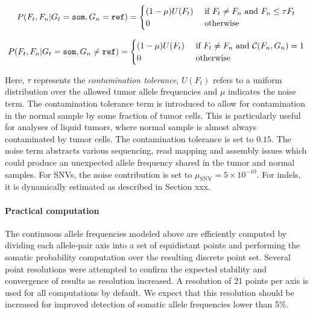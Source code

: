 \documentclass{article}
\begin{document}
\begin{equation*}
P(F_t, F_n | G_t = {\tt som}, G_n = {\tt ref})=
\begin{cases}
	(1-\mu)U(F_t) & \text{ if } F_t \neq F_n \text{ and } F_n \leq \tau F_t \\
	0 & \text{ otherwise } \\
\end{cases}
\end{equation*}

\begin{equation*}
P(F_t, F_n | G_t = {\tt som}, G_n \neq {\tt ref})=
\begin{cases}
	(1-\mu)U(F_t) & \text{ if } F_t \neq F_n \text{ and } {\cal C}(F_n, G_n) = 1\\
	0 & \text{ otherwise } \\
\end{cases}
\end{equation*}

\noindent Here, $\tau$ represents the {\em contamination tolerance}, $U(F_t)$ refers to a uniform distribution over the allowed tumor allele frequencies and $\mu$ indicates the noise term. The contamination tolerance term is introduced to allow for contamination in the normal sample by some fraction of tumor cells. This is particularly useful for analyses of liquid tumors, where normal sample is almost always contaminated by tumor cells. The contamination tolerance is set to $0.15$. The noise term abstracts various sequencing, read mapping and assembly issues which could produce an unexpected allele frequency shared in the tumor and normal samples. For SNVs, the noise contribution is set to $\mu_{\text{SNV}} = 5 \times 10^{-10}$. For indels, it is dynamically estimated as described in Section xxx. 


\paragraph{Practical computation}
The continuous allele frequencies modeled above are efficiently computed by dividing each allele-pair axis into a set of equidistant points and performing the somatic probability computation over the resulting discrete point set. Several point resolutions were attempted to confirm the expected stability and convergence of results as resolution increased. A resolution of 21 points per axis is used for all computations by default. We expect that this resolution should be increased for improved detection of somatic allele frequencies lower than 5\%.
\end{document}
